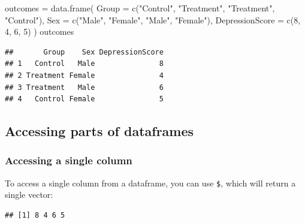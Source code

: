 \documentclass[
]{book}
\newenvironment{Shaded}{\begin{snugshade}}{\end{snugshade}}
\newcommand{\AttributeTok}[1]{\textcolor[rgb]{0.77,0.63,0.00}{#1}}
\newcommand{\DecValTok}[1]{\textcolor[rgb]{0.00,0.00,0.81}{#1}}
\newcommand{\FunctionTok}[1]{\textcolor[rgb]{0.00,0.00,0.00}{#1}}
\newcommand{\NormalTok}[1]{#1}
\newcommand{\OtherTok}[1]{\textcolor[rgb]{0.56,0.35,0.01}{#1}}
\newcommand{\SpecialCharTok}[1]{\textcolor[rgb]{0.00,0.00,0.00}{#1}}
\newcommand{\StringTok}[1]{\textcolor[rgb]{0.31,0.60,0.02}{#1}}
\begin{document}
\begin{Shaded}
\begin{Highlighting}[]
\NormalTok{outcomes }\OtherTok{=} \FunctionTok{data.frame}\NormalTok{(}
    \AttributeTok{Group =} \FunctionTok{c}\NormalTok{(}\StringTok{"Control"}\NormalTok{, }\StringTok{"Treatment"}\NormalTok{, }\StringTok{"Treatment"}\NormalTok{, }\StringTok{"Control"}\NormalTok{),}
    \AttributeTok{Sex =} \FunctionTok{c}\NormalTok{(}\StringTok{"Male"}\NormalTok{, }\StringTok{"Female"}\NormalTok{, }\StringTok{"Male"}\NormalTok{, }\StringTok{"Female"}\NormalTok{),}
    \AttributeTok{DepressionScore =} \FunctionTok{c}\NormalTok{(}\DecValTok{8}\NormalTok{, }\DecValTok{4}\NormalTok{, }\DecValTok{6}\NormalTok{, }\DecValTok{5}\NormalTok{)}
\NormalTok{)}
\NormalTok{outcomes}
\end{Highlighting}
\end{Shaded}

\begin{verbatim}
##       Group    Sex DepressionScore
## 1   Control   Male               8
## 2 Treatment Female               4
## 3 Treatment   Male               6
## 4   Control Female               5
\end{verbatim}

\hypertarget{accessing-parts-of-dataframes}{%
\subsection{Accessing parts of dataframes}\label{accessing-parts-of-dataframes}}

\hypertarget{accessing-a-single-column}{%
\subsubsection*{Accessing a single column}\label{accessing-a-single-column}}

To access a single column from a dataframe, you can use \texttt{\$}, which will
return a single vector:

\begin{Shaded}
\end{Shaded}

\begin{verbatim}
## [1] 8 4 6 5
\end{verbatim}
\end{document}
